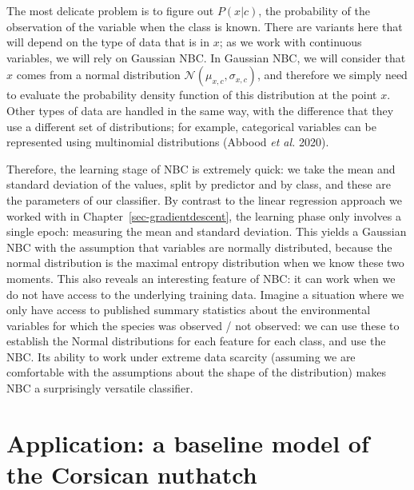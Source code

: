 \documentclass[
  letterpaper,
]{scrbook}
\begin{document}
The most delicate problem is to figure out \(P(x|c)\), the probability
of the observation of the variable when the class is known. There are
variants here that will depend on the type of data that is in \(x\); as
we work with continuous variables, we will rely on Gaussian NBC. In
Gaussian NBC, we will consider that \(x\) comes from a normal
distribution \(\mathcal{N}(\mu_{x,c},\sigma_{x,c})\), and therefore we
simply need to evaluate the probability density function of this
distribution at the point \(x\). Other types of data are handled in the
same way, with the difference that they use a different set of
distributions; for example, categorical variables can be represented
using multinomial distributions (Abbood \emph{et al.} 2020).


Therefore, the learning stage of NBC is extremely quick: we take the
mean and standard deviation of the values, split by predictor and by
class, and these are the parameters of our classifier. By contrast to
the linear regression approach we worked with in
Chapter~\ref{sec-gradientdescent}, the learning phase only involves a
single epoch: measuring the mean and standard deviation. This yields a
Gaussian NBC with the assumption that variables are normally
distributed, because the normal distribution is the maximal entropy
distribution when we know these two moments. This also reveals an
interesting feature of NBC: it can work when we do not have access to
the underlying training data. Imagine a situation where we only have
access to published summary statistics about the environmental variables
for which the species was observed / not observed: we can use these to
establish the Normal distributions for each feature for each class, and
use the NBC. Its ability to work under extreme data scarcity (assuming
we are comfortable with the assumptions about the shape of the
distribution) makes NBC a surprisingly versatile classifier.

\section{Application: a baseline model of the Corsican
nuthatch}\label{application-a-baseline-model-of-the-corsican-nuthatch}
\end{document}
